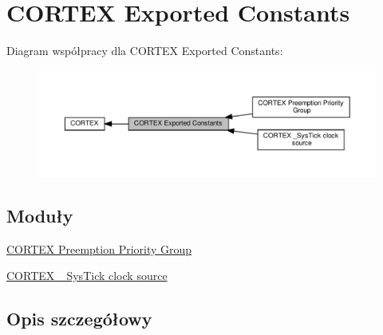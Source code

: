 \hypertarget{group___c_o_r_t_e_x___exported___constants}{}\section{C\+O\+R\+T\+EX Exported Constants}
\label{group___c_o_r_t_e_x___exported___constants}
Diagram współpracy dla C\+O\+R\+T\+EX Exported Constants\+:\nopagebreak
\begin{figure}[H]
\begin{center}
\leavevmode
\includegraphics[width=350pt]{group___c_o_r_t_e_x___exported___constants}
\end{center}
\end{figure}
\subsection*{Moduły}
\begin{DoxyCompactItemize}
\item 
\hyperlink{group___c_o_r_t_e_x___preemption___priority___group}{C\+O\+R\+T\+E\+X Preemption Priority Group}
\item 
\hyperlink{group___c_o_r_t_e_x___sys_tick__clock__source}{C\+O\+R\+T\+E\+X \+\_\+\+Sys\+Tick clock source}
\end{DoxyCompactItemize}


\subsection{Opis szczegółowy}
